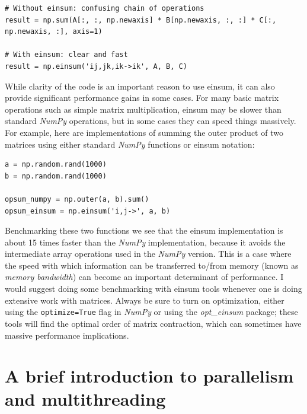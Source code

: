 \begin{lstlisting}[style=Python]
# Without einsum: confusing chain of operations
result = np.sum(A[:, :, np.newaxis] * B[np.newaxis, :, :] * C[:, np.newaxis, :], axis=1)

# With einsum: clear and fast
result = np.einsum('ij,jk,ik->ik', A, B, C)
\end{lstlisting}

While clarity of the code is an important reason to use einsum, it can also provide significant performance gains in some cases.  For many basic matrix operations such as simple matrix multiplication, einsum may be slower than standard \textit{NumPy} operations, but in some cases they can speed things massively.  For example, here are implementations of summing the outer product of two matrices using either standard \textit{NumPy} functions or einsum notation:

\begin{lstlisting}[style=Python]
a = np.random.rand(1000)
b = np.random.rand(1000)

opsum_numpy = np.outer(a, b).sum()
opsum_einsum = np.einsum('i,j->', a, b)
\end{lstlisting}

Benchmarking these two functions we see that the einsum implementation is about 15 times faster than the \textit{NumPy} implementation, because it avoids the intermediate array operations used in the \textit{NumPy} version. This is a case where the speed with which information can be transferred to/from memory (known as \textit{memory bandwidth}) can become an important determinant of performance.  I would suggest doing some benchmarking with einsum tools whenever one is doing extensive work with matrices.  Always be sure to turn on optimization, either using the \texttt{optimize=True} flag in \textit{NumPy} or using the \textit{opt\_einsum} package; these tools will find the optimal order of matrix contraction, which can sometimes have massive performance implications.

\section{A brief introduction to parallelism and multithreading}

